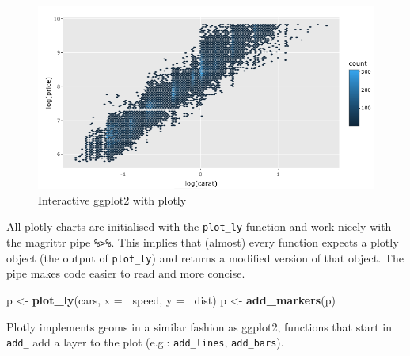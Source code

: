 \documentclass[10pt,]{krantz}
\makeatletter
\newenvironment{Shaded}{\begin{snugshade}}{\end{snugshade}}
\newcommand{\DataTypeTok}[1]{\textcolor[rgb]{0.27,0.27,0.27}{#1}}
\newcommand{\KeywordTok}[1]{\textcolor[rgb]{0.27,0.27,0.27}{\textbf{#1}}}
\newcommand{\NormalTok}[1]{#1}
\newcommand{\OperatorTok}[1]{\textcolor[rgb]{0.43,0.43,0.43}{\textbf{#1}}}
\newcommand{\StringTok}[1]{\textcolor[rgb]{0.5,0.5,0.5}{#1}}
\newenvironment{kframe}{%
\medskip{}
\setlength{\fboxsep}{.8em}
 \def\at@end@of@kframe{}%
 \ifinner\ifhmode%
  \def\at@end@of@kframe{\end{minipage}}%
  \begin{minipage}{\columnwidth}%
 \fi\fi%
 \def\FrameCommand##1{\hskip\@totalleftmargin \hskip-\fboxsep
 \colorbox{shadecolor}{##1}\hskip-\fboxsep
     \hskip-\linewidth \hskip-\@totalleftmargin \hskip\columnwidth}%
 \MakeFramed {\advance\hsize-\width
   \@totalleftmargin\z@ \linewidth\hsize
   \@setminipage}}%
 {\par\unskip\endMakeFramed%
 \at@end@of@kframe}
\renewenvironment{Shaded}{\begin{kframe}}{\end{kframe}}
\makeatother
\begin{document}
\begin{figure}[H]

{\centering \includegraphics[width=1\linewidth]{images/03-ggplotly} 

}

\caption{Interactive ggplot2 with plotly}\label{fig:plotly-ggplotly-diagram}
\end{figure}

All plotly charts are initialised with the \texttt{plot\_ly} function and work nicely with the magrittr \citep{R-magrittr} pipe \texttt{\%\textgreater{}\%}. This implies that (almost) every function expects a plotly object (the output of \texttt{plot\_ly}) and returns a modified version of that object. The pipe makes code easier to read and more concise.

\begin{Shaded}
\begin{Highlighting}[]
\NormalTok{p <-}\StringTok{ }\KeywordTok{plot_ly}\NormalTok{(cars, }\DataTypeTok{x =} \OperatorTok{~}\NormalTok{speed, }\DataTypeTok{y =} \OperatorTok{~}\NormalTok{dist) }
\NormalTok{p <-}\StringTok{ }\KeywordTok{add_markers}\NormalTok{(p)}
\end{Highlighting}
\end{Shaded}

Plotly implements geoms in a similar fashion as ggplot2, functions that start in \texttt{add\_} add a layer to the plot (e.g.: \texttt{add\_lines}, \texttt{add\_bars}).

\begin{Shaded}
\end{Shaded}
\end{document}
